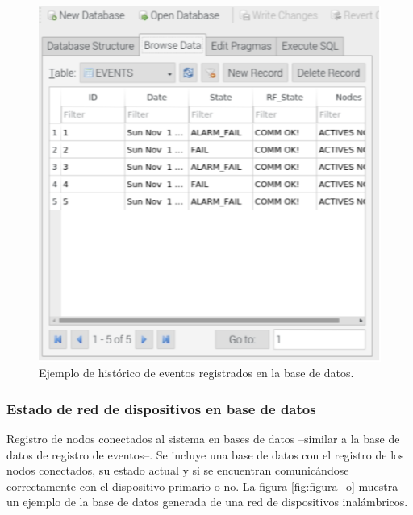 \break

\begin{figure}[ht]

	\centering
	\includegraphics[scale=.45]{./Figures/Capitulo4/Figura_P.png}
	\caption{Ejemplo de histórico de eventos registrados en la base de datos.}
	\label{fig:figura_p}
\end{figure}

\subsubsection{Estado de red de dispositivos en base de datos}
Registro de nodos conectados al sistema en bases de datos --similar a la base de datos de registro de eventos--. Se incluye una base de datos con el registro de los nodos conectados, su estado actual y si se encuentran comunicándose correctamente con el dispositivo primario o no. La figura \ref{fig:figura_o}  muestra un ejemplo de la base de datos generada de una red de dispositivos inalámbricos.


